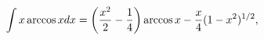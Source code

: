 \[\int x\mathop{\mathrm{arccos}\/}\nolimits xdx=\left(\frac{x^{2}}{2}-\frac{1}{4%
}\right)\mathop{\mathrm{arccos}\/}\nolimits x-\frac{x}{4}(1-x^{2})^{1/2},\]